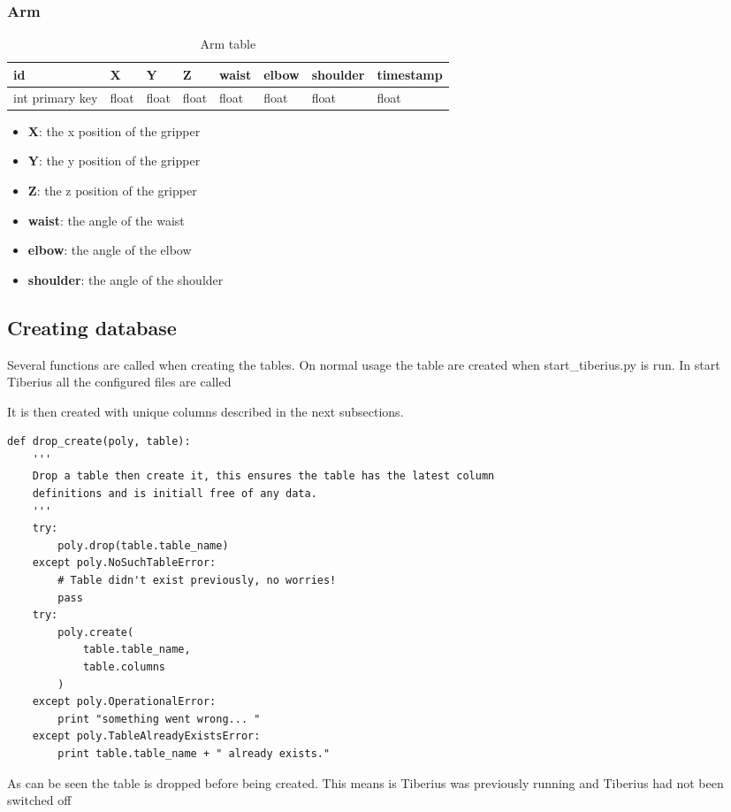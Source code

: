 \subsubsection{Arm}
\begin{table}[!htb]
\centering
\caption{Arm table}
\label{tab:db-arm}
\begin{tabular}{@{}llllllll@{}}
\toprule
id              & X     & Y     & Z     & waist & elbow & shoulder & timestamp \\ \midrule
int primary key & float & float & float & float & float & float    & float
\end{tabular}
\end{table}
\begin{itemize}
\item{\textbf{X}}: the x position of the gripper 
\item{\textbf{Y}}: the y position of the gripper
\item{\textbf{Z}}: the z position of the gripper
\item{\textbf{waist}}: the angle of the waist
\item{\textbf{elbow}}: the angle of the elbow
\item{\textbf{shoulder}}: the angle of the shoulder
\end{itemize}

\subsection{Creating database}
Several functions are called when creating the tables. On normal usage the table are created when start\_tiberius.py is run. In start Tiberius all the configured files are called




It is then created with unique columns described in the next subsections.

\begin{lstlisting}[style=custompython]
def drop_create(poly, table):
    '''
    Drop a table then create it, this ensures the table has the latest column
    definitions and is initiall free of any data.
    '''
    try:
        poly.drop(table.table_name)
    except poly.NoSuchTableError:
        # Table didn't exist previously, no worries!
        pass
    try:
        poly.create(
            table.table_name,
            table.columns
        )
    except poly.OperationalError:
        print "something went wrong... "
    except poly.TableAlreadyExistsError:
        print table.table_name + " already exists."
\end{lstlisting}
As can be seen the table is dropped before being created. This means is Tiberius was previously running and Tiberius had not been switched off

